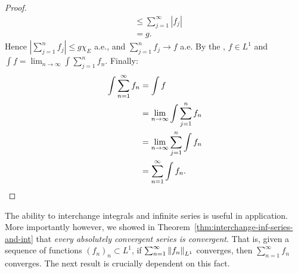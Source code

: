 \begin{proof}
\begin{equation*}
\begin{split}
                & \leq \sum_{j = 1}^\infty |f_j| \\
                & = g.
            \end{split}
            \end{equation*}
        Hence $\left| \sum_{j = 1}^n f_j \right| \leq g \chi_E$ a.e., and $\sum_{j = 1}^n f_j \rightarrow f$ a.e. By the , $f \in L^1$ and $\int f = \lim_{n \rightarrow \infty} \int \sum_{j = 1}^n f_n$. Finally:
            \begin{equation*}
            \begin{split}
                \int \sum_{n = 1}^\infty f_n 
                & = \int f \\
                & = \lim_{n \rightarrow \infty} \int \sum_{j = 1}^n f_n \\
                & = \lim_{n \rightarrow \infty} \sum_{j = 1}^n \int f_n \\
                & = \sum_{n = 1}^\infty \int f_n. \qedhere
            \end{split}
            \end{equation*}
    \end{proof}

The ability to interchange integrals and infinite series is useful in application. More importantly however, we showed in Theorem~\ref{thm:interchange-inf-series-and-int} that \textit{every absolutely convergent series is convergent}. That is, given a sequence of functions $(f_n)_n \subset L^1$, if $\sum_{n = 1}^\infty \left\lVert f_n \right\rVert_{L^1}$ converges, then $\sum_{n = 1}^\infty f_n$ converges. The next result is crucially dependent on this fact.

